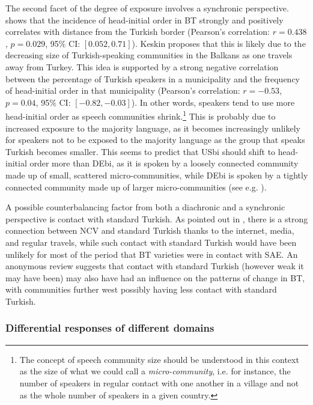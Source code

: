 \documentclass[output=paper,colorlinks,citecolor=brown]{langscibook}
\begin{document}
The second facet of the degree of exposure involves a synchronic perspective. \citet{Keskin.directionality} shows that the incidence of head-initial order in BT strongly and positively correlates with distance from the Turkish border (Pearson's correlation: $r = 0.438$, $p = 0.029$, 95\% CI: $[0.052, 0.71]$). Keskin proposes that this is likely due to the decreasing size of Turkish-speaking communities in the Balkans as one travels away from Turkey. This idea is supported by a strong negative correlation between the percentage of Turkish speakers in a municipality and the frequency of head-initial order in that municipality (Pearson's correlation: $r = -0.53$, $p = 0.04$, 95\% CI: $[-0.82, -0.03]$). In other words, speakers tend to use more head-initial order as speech communities shrink.\footnote{The concept of speech community size should be understood in this context as the size of what we could call a \textit{micro-community}, i.e. for instance, the number of speakers in regular contact with one another in a village and not as the whole number of speakers in a given country.} This is probably due to increased exposure to the majority language, as it becomes increasingly unlikely for speakers not to be exposed to the majority language as the group that speaks Turkish becomes smaller. This seems to predict that USbi should shift to head-initial order more than DEbi, as it is spoken by a loosely connected community made up of small, scattered micro-communities, while DEbi is spoken by a tightly connected community made up of larger micro-communities (see e.g. \citealt{Iefremenko.Schroeder.Kornfilt.conv,Ozsoyetal.combining}).

A possible counterbalancing factor from both a diachronic and a synchronic perspective is contact with standard Turkish. As pointed out in , there is a strong connection between NCV and standard Turkish thanks to the internet, media, and regular travels, while such contact with standard Turkish would have been unlikely for most of the period that BT varieties were in contact with SAE. An anonymous review suggests that contact with standard Turkish (however weak it may have been) may also have had an influence on the patterns of change in BT, with communities further west possibly having less contact with standard Turkish.

\subsubsection{Differential responses of different domains} 
\end{document}
